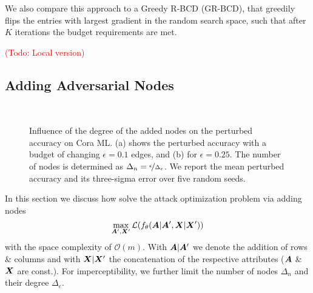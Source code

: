 \documentclass[sigconf,authordraft]{acmart}
\newcommand{\adj}{\mA}
\newcommand{\features}{\mX}
\newcommand{\todo}[1]{\textcolor{red}{(Todo: #1)}}
\begin{document}
We also compare this approach to a Greedy R-BCD (GR-BCD), that greedily flips the entries with largest gradient in the random search space, such that after \(K\) iterations the budget requirements are met.

\todo{Local version}

\subsection{Adding Adversarial Nodes}\label{sec:attackkdd}

\begin{figure}[t]
  \centering
  \hbox{\hspace{45pt} \resizebox{0.7\linewidth}{!}{}}
  \vspace{-14pt}
  \caption{Influence of the degree of the added nodes on the perturbed accuracy on Cora ML. (a) shows the perturbed accuracy with a budget of changing \(\epsilon=0.1\) edges, and (b) for \(\epsilon=0.25\). The number of nodes is determined as \(\Delta_n = \nicefrac{\epsilon}{\Delta_e}\). We report the mean perturbed accuracy and its three-sigma error over five random seeds. \label{fig:gangnodeeffectiveness}}
\end{figure}

In this section we discuss how solve the attack optimization problem via adding nodes
\begin{equation}\label{eq:gang}
  \max_{\adj^\prime, \features^\prime} \mathcal{L}(f_{\theta}(\adj | \adj^\prime, \features | \features^\prime))
\end{equation}
with the space complexity of \(\mathcal{O}(m)\). With \(\adj | \adj^\prime\) we denote the addition of rows \& columns and with \(\features | \features^\prime\) the concatenation of the respective attributes (\(\adj\) \& \(\features\) are const.). For imperceptibility, we further limit the number of nodes \(\Delta_n\) and their degree \(\Delta_e\).
\end{document}
